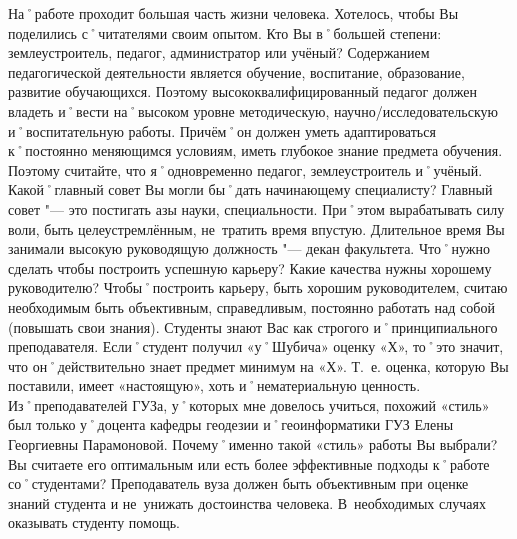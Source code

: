 \begin{drama}
	\maxspeaks На˚работе проходит большая часть жизни человека. Хотелось, чтобы Вы поделились с˚читателями своим опытом. Кто Вы в˚большей степени: землеустроитель, педагог, администратор или учёный?
	\michaelspeaks Содержанием педагогической деятельности является обучение, воспитание, образование, развитие обучающихся. Поэтому высококвалифицированный педагог должен владеть и˚вести на˚высоком уровне методическую, научно\-/исследовательскую и˚воспитательную работы. Причём˚он должен уметь адаптироваться к˚постоянно меняющимся условиям, иметь глубокое знание предмета обучения. Поэтому считайте, что я˚одновременно педагог, землеустроитель и˚учёный.
	\maxspeaks Какой˚главный совет Вы могли бы˚дать начинающему специалисту?
	\michaelspeaks Главный совет "--- это постигать азы науки, специальности. При˚этом вырабатывать силу воли, быть целеустремлённым, не~тратить время впустую.
	\maxspeaks Длительное время Вы занимали высокую руководящую должность "--- декан факультета. Что˚нужно сделать чтобы построить успешную карьеру? Какие качества нужны хорошему руководителю?
	\michaelspeaks Чтобы˚построить карьеру, быть хорошим руководителем, считаю необходимым быть объективным, справедливым, постоянно работать над собой (повышать свои знания).
	\maxspeaks Студенты знают Вас как строгого и˚принципиального преподавателя. Если˚студент получил  «у˚Шубича» оценку  «Х», то˚это значит, что он˚действительно знает предмет минимум на  «Х». Т.~е. оценка, которую Вы поставили, имеет  «настоящую», хоть и˚нематериальную ценность. Из˚преподавателей ГУЗа, у˚которых мне довелось учиться, похожий  «стиль» был только у˚доцента кафедры геодезии и˚геоинформатики ГУЗ Елены Георгиевны Парамоновой. Почему˚именно такой  «стиль» работы Вы выбрали? Вы считаете его оптимальным или есть более эффективные подходы к˚работе со˚студентами?
	\michaelspeaks Преподаватель вуза должен быть объективным при оценке знаний студента и не~унижать достоинства человека. В~необходимых случаях оказывать студенту помощь.


\end{drama}
